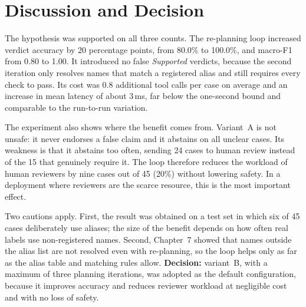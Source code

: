 \section{Discussion and Decision}

The hypothesis was supported on all three counts. The re-planning loop increased verdict accuracy by
20 percentage points, from 80.0\% to 100.0\%, and macro-F1 from 0.80 to 1.00. It introduced no false
\emph{Supported} verdicts, because the second iteration only resolves names that match a registered
alias and still requires every check to pass. Its cost was 0.8 additional tool calls per case on
average and an increase in mean latency of about 3\,ms, far below the one-second bound and comparable
to the run-to-run variation.

The experiment also shows where the benefit comes from. Variant~A is not unsafe: it never endorses a
false claim and it abstains on all unclear cases. Its weakness is that it abstains too often, sending
24 cases to human review instead of the 15 that genuinely require it. The loop therefore reduces the
workload of human reviewers by nine cases out of 45 (20\%) without lowering safety. In a deployment
where reviewers are the scarce resource, this is the most important effect.

Two cautions apply. First, the result was obtained on a test set in which six of 45 cases deliberately
use aliases; the size of the benefit depends on how often real labels use non-registered names. Second,
Chapter~7 showed that names outside the alias list are not resolved even with re-planning, so the loop
helps only as far as the alias table and matching rules allow. \textbf{Decision:} variant~B, with a
maximum of three planning iterations, was adopted as the default configuration, because it improves
accuracy and reduces reviewer workload at negligible cost and with no loss of safety.
